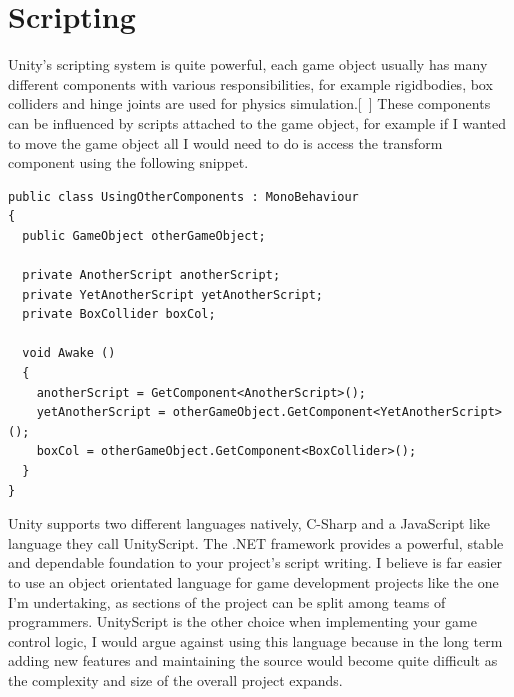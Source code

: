 \section{Scripting}
Unity's scripting system is quite powerful, each game object usually has many different components with various responsibilities, for example rigidbodies, box colliders and hinge joints are used for physics simulation.[~\cite{Scripting}] These components can be influenced by scripts attached to the game object, for example if I wanted to move the game object all I would need to do is access the transform component using the following snippet.
\begin{verbatim}
public class UsingOtherComponents : MonoBehaviour
{
  public GameObject otherGameObject;

  private AnotherScript anotherScript;
  private YetAnotherScript yetAnotherScript;
  private BoxCollider boxCol;

  void Awake ()
  {
    anotherScript = GetComponent<AnotherScript>();
    yetAnotherScript = otherGameObject.GetComponent<YetAnotherScript>();
    boxCol = otherGameObject.GetComponent<BoxCollider>();
  }
}
\end{verbatim}
Unity supports two different languages natively, C-Sharp and a JavaScript like language they call UnityScript. The .NET framework provides a powerful, stable and dependable foundation to your project's script writing. I believe is far easier to use an object orientated language for game development projects like the one I'm undertaking, as sections of the project can be split among teams of programmers. 
UnityScript is the other choice when implementing your game control logic, I would argue against using this language because in the long term adding new features and maintaining the source would become quite difficult as the complexity and size of the overall project expands.
